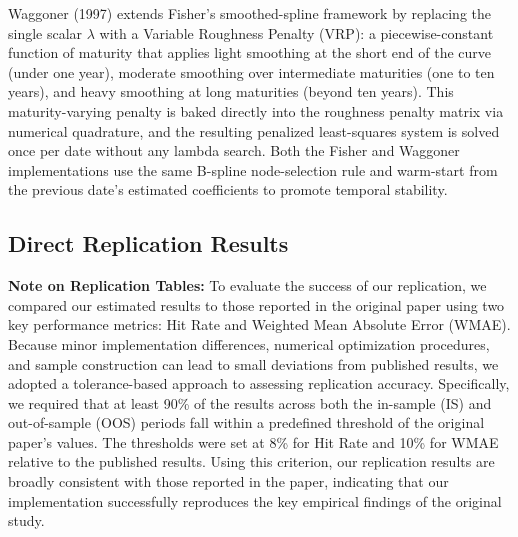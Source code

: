 \documentclass{article}
\begin{document}
Waggoner (1997) extends Fisher's smoothed-spline framework by replacing the single scalar $\lambda$ with a Variable Roughness Penalty (VRP): a piecewise-constant function of maturity that applies light smoothing at the short end of the curve (under one year), moderate smoothing over intermediate maturities (one to ten years), and heavy smoothing at long maturities (beyond ten years). This maturity-varying penalty is baked directly into the roughness penalty matrix via numerical quadrature, and the resulting penalized least-squares system is solved once per date without any lambda search. Both the Fisher and Waggoner implementations use the same B-spline node-selection rule and warm-start from the previous date's estimated coefficients to promote temporal stability.

\subsection{Direct Replication Results}

\begin{table}[htbp]
\centering

\caption{Comparison of replication results to the original paper for the in-sample period. The table reports weighted mean absolute pricing error (WMAE) and bid-ask hit rates across maturity buckets for the McCulloch, Fisher, and Waggoner spline methods. The key takeaway is that the replicated models broadly reproduce the performance patterns reported in the original study, confirming that the implementation successfully matches the behavior of the published methods.}
\label{tab:1a}
\end{table}

\begin{table}[htbp]
\centering

\caption{Out-of-sample performance of the replicated spline models compared with the original paper. The table evaluates WMAE and bid-ask hit rates across maturity buckets. The main takeaway is that the replication produces similar relative performance across methods and maturities, suggesting the implementation generalizes reasonably well outside the estimation sample.}
\label{tab:1b}
\end{table}

\textbf{Note on Replication Tables:} To evaluate the success of our replication, we compared our estimated results to those reported in the original paper using two key performance metrics: Hit Rate and Weighted Mean Absolute Error (WMAE). Because minor implementation differences, numerical optimization procedures, and sample construction can lead to small deviations from published results, we adopted a tolerance-based approach to assessing replication accuracy. Specifically, we required that at least 90\% of the results across both the in-sample (IS) and out-of-sample (OOS) periods fall within a predefined threshold of the original paper’s values. The thresholds were set at 8\% for Hit Rate and 10\% for WMAE relative to the published results. Using this criterion, our replication results are broadly consistent with those reported in the paper, indicating that our implementation successfully reproduces the key empirical findings of the original study.
\end{document}
